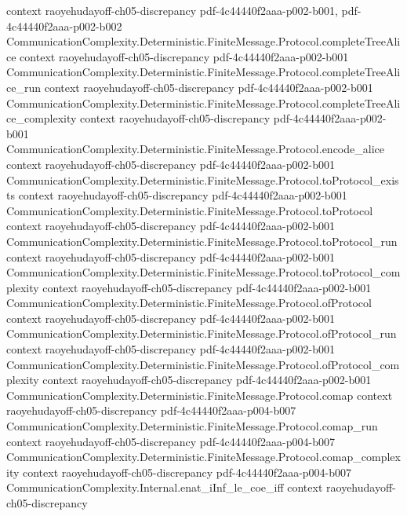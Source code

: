 \begin{theorem}
  {context}
  {raoyehudayoff-ch05-discrepancy}
  {pdf-4c44440f2aaa-p002-b001,
    pdf-4c44440f2aaa-p002-b002}
\proofstep
  {CommunicationComplexity.Deterministic.FiniteMessage.Protocol.completeTreeAlice}
  {context}
  {raoyehudayoff-ch05-discrepancy}
  {pdf-4c44440f2aaa-p002-b001}
\proofstep
  {CommunicationComplexity.Deterministic.FiniteMessage.Protocol.completeTreeAlice_run}
  {context}
  {raoyehudayoff-ch05-discrepancy}
  {pdf-4c44440f2aaa-p002-b001}
\proofstep
  {CommunicationComplexity.Deterministic.FiniteMessage.Protocol.completeTreeAlice_complexity}
  {context}
  {raoyehudayoff-ch05-discrepancy}
  {pdf-4c44440f2aaa-p002-b001}
\proofstep
  {CommunicationComplexity.Deterministic.FiniteMessage.Protocol.encode_alice}
  {context}
  {raoyehudayoff-ch05-discrepancy}
  {pdf-4c44440f2aaa-p002-b001}
\proofstep
  {CommunicationComplexity.Deterministic.FiniteMessage.Protocol.toProtocol_exists}
  {context}
  {raoyehudayoff-ch05-discrepancy}
  {pdf-4c44440f2aaa-p002-b001}
\proofstep
  {CommunicationComplexity.Deterministic.FiniteMessage.Protocol.toProtocol}
  {context}
  {raoyehudayoff-ch05-discrepancy}
  {pdf-4c44440f2aaa-p002-b001}
\proofstep
  {CommunicationComplexity.Deterministic.FiniteMessage.Protocol.toProtocol_run}
  {context}
  {raoyehudayoff-ch05-discrepancy}
  {pdf-4c44440f2aaa-p002-b001}
\proofstep
  {CommunicationComplexity.Deterministic.FiniteMessage.Protocol.toProtocol_complexity}
  {context}
  {raoyehudayoff-ch05-discrepancy}
  {pdf-4c44440f2aaa-p002-b001}
\proofstep
  {CommunicationComplexity.Deterministic.FiniteMessage.Protocol.ofProtocol}
  {context}
  {raoyehudayoff-ch05-discrepancy}
  {pdf-4c44440f2aaa-p002-b001}
\proofstep
  {CommunicationComplexity.Deterministic.FiniteMessage.Protocol.ofProtocol_run}
  {context}
  {raoyehudayoff-ch05-discrepancy}
  {pdf-4c44440f2aaa-p002-b001}
\proofstep
  {CommunicationComplexity.Deterministic.FiniteMessage.Protocol.ofProtocol_complexity}
  {context}
  {raoyehudayoff-ch05-discrepancy}
  {pdf-4c44440f2aaa-p002-b001}
\proofstep
  {CommunicationComplexity.Deterministic.FiniteMessage.Protocol.comap}
  {context}
  {raoyehudayoff-ch05-discrepancy}
  {pdf-4c44440f2aaa-p004-b007}
\proofstep
  {CommunicationComplexity.Deterministic.FiniteMessage.Protocol.comap_run}
  {context}
  {raoyehudayoff-ch05-discrepancy}
  {pdf-4c44440f2aaa-p004-b007}
\proofstep
  {CommunicationComplexity.Deterministic.FiniteMessage.Protocol.comap_complexity}
  {context}
  {raoyehudayoff-ch05-discrepancy}
  {pdf-4c44440f2aaa-p004-b007}
\proofstep
  {CommunicationComplexity.Internal.enat_iInf_le_coe_iff}
  {context}
  {raoyehudayoff-ch05-discrepancy}

\end{theorem}
